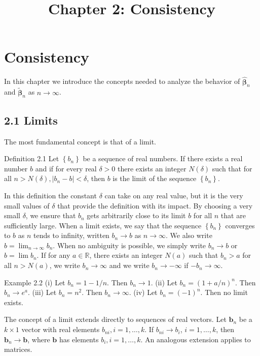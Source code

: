 \documentclass[10pt]{article}
\title{Chapter 2: Consistency}
\author{}
\date{}
\begin{document}
\maketitle

\section*{Consistency}
In this chapter we introduce the concepts needed to analyze the behavior of $\hat{\boldsymbol{\beta}}_{n}$ and $\tilde{\boldsymbol{\beta}}_{n}$ as $n \rightarrow \infty$.

\subsection*{2.1 Limits}
The most fundamental concept is that of a limit.

Definition 2.1 Let $\left\{b_{n}\right\}$ be a sequence of real numbers. If there exists a real number $b$ and if for every real $\delta>0$ there exists an integer $N(\delta)$ such that for all $n>N(\delta),\left|b_{n}-b\right|<\delta$, then $b$ is the limit of the sequence $\left\{b_{n}\right\}$.

In this definition the constant $\delta$ can take on any real value, but it is the very small values of $\delta$ that provide the definition with its impact. By choosing a very small $\delta$, we ensure that $b_{n}$ gets arbitrarily close to its limit $b$ for all $n$ that are sufficiently large. When a limit exists, we say that the sequence $\left\{b_{n}\right\}$ converges to $b$ as $n$ tends to infinity, written $b_{n} \rightarrow b$ as $n \rightarrow \infty$. We also write $b=\lim _{n \rightarrow \infty} b_{n}$. When no ambiguity is possible, we simply write $b_{n} \rightarrow b$ or $b=\lim b_{n}$. If for any $a \in \mathbb{R}$, there exists an integer $N(a)$ such that $b_{n}>a$ for all $n>N(a)$, we write $b_{n} \rightarrow \infty$ and we write $b_{n} \rightarrow-\infty$ if $-b_{n} \rightarrow \infty$.

Example 2.2 (i) Let $b_{n}=1-1 / n$. Then $b_{n} \rightarrow 1$. (ii) Let $b_{n}=(1+a / n)^{n}$. Then $b_{n} \rightarrow e^{a}$. (iii) Let $b_{n}=n^{2}$. Then $b_{n} \rightarrow \infty$. (iv) Let $b_{n}=(-1)^{n}$. Then no limit exists.

The concept of a limit extends directly to sequences of real vectors. Let $\mathbf{b}_{n}$ be a $k \times 1$ vector with real elements $b_{n i}, i=1, \ldots, k$. If $b_{n i} \rightarrow b_{i}$, $i=1, \ldots, k$, then $\mathbf{b}_{n} \rightarrow \mathbf{b}$, where $\mathbf{b}$ has elements $b_{i}, i=1, \ldots, k$. An analogous extension applies to matrices.
\end{document}
